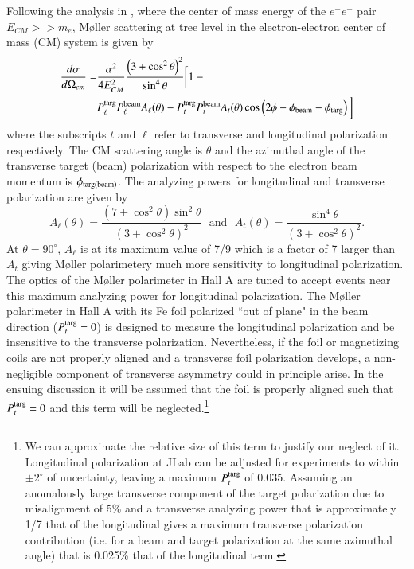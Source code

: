 \documentclass[preprint,12pt]{elsarticle}
\begin{document}
Following the analysis in \cite{Swartz1995}, where the center of mass energy of the $e^-e^-$ pair $E_{CM}>>m_e$, M\o ller scattering at tree level in the electron-electron center of mass (CM) system is given by
\begin{align}
\frac{d\sigma}{d\Omega_{cm}}=&\frac{\alpha^2}{4E_{CM}^2}\frac{\left(3+\cos^2\theta\right)^2}{\sin^4\theta}\bigg[1- \bigg. \nonumber \\
&\bigg. P^{\rm targ}_{\ell}P^{\rm beam}_{\ell}A_{\ell}(\theta)-P^{\rm targ}_tP^{\rm beam}_tA_t(\theta)\cos\left(2\phi-\phi_{\rm beam}-\phi_{\rm targ}\right)\bigg]
\label{eq:moller_cx}
\end{align}
where the subscripts $t$ and $\ell$ refer to transverse and longitudinal polarization respectively. The CM scattering angle is $\theta$ and the azimuthal angle of the transverse target (beam) polarization with respect to the electron beam momentum is $\phi_{\rm targ(beam)}$. The analyzing powers for longitudinal and transverse polarization are given by
\begin{equation}
A_{\ell}(\theta)=\frac{\left(7+\cos^2\theta\right)\sin^2\theta}{\left(3+\cos^2\theta\right)^2}~~~\textrm{and}~~~A_t(\theta)=\frac{\sin^4\theta}{\left(3+\cos^2\theta\right)^2}.
\label{eq:analyzing_pow}
\end{equation}
At $\theta=90^\circ$, $A_{\ell}$ is at its maximum value of 7/9 which is a factor of 7 larger than $A_t$ giving M\o ller polarimetery much more sensitivity to longitudinal polarization. The optics of the M\o ller polarimeter in Hall A are tuned to accept events near this maximum analyzing power for longitudinal polarization. The M\o ller polarimeter in Hall A with its Fe foil polarized ``out of plane" in the beam direction ($P^{\rm targ}_t=0$) is designed to measure the longitudinal polarization and be insensitive to the transverse polarization. Nevertheless, if the foil or magnetizing coils are not properly aligned and a transverse foil polarization develops, a non-negligible component of transverse asymmetry could in principle arise. In the ensuing discussion it will be assumed that the foil is properly aligned such that $P^{\rm targ}_t=0$ and this term will be neglected.\footnote{We can approximate the relative size of this term to justify our neglect of it. Longitudinal polarization at JLab can be adjusted for experiments to within $\pm2^\circ$ of uncertainty, leaving a maximum $P^{\rm targ}_t$ of 0.035. Assuming an anomalously large transverse component of the target polarization due to misalignment of 5\% and a transverse analyzing power that is approximately 1/7 that of the longitudinal gives a maximum transverse polarization contribution (i.e. for a beam and target polarization at the same azimuthal angle) that is 0.025\% that of the longitudinal term.}
\end{document}
